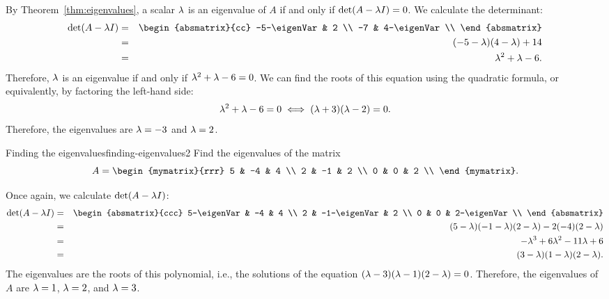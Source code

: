 \begin{solution}
  By Theorem~\ref{thm:eigenvalues}, a scalar $\lambda$ is an
  eigenvalue of $A$ if and only if $\det(A-\lambda I)=0$. We calculate
  the determinant:
  \begin{eqnarray*}
    \det(A-\eigenVar I)
    &=&
    \begin{absmatrix}{cc}
      -5-\eigenVar & 2 \\
      -7 & 4-\eigenVar \\
    \end{absmatrix} \\
    &=& (-5-\eigenVar)(4-\eigenVar) + 14 \\
    &=& \eigenVar^2 + \eigenVar - 6.
  \end{eqnarray*}
  Therefore, $\lambda$ is an eigenvalue if and only if
  $\lambda^2 + \lambda - 6 = 0$. We can find the roots of this
  equation using the quadratic formula, or equivalently, by factoring
  the left-hand side:
  \begin{equation*}
    \lambda^2 + \lambda - 6 = 0
    \iff
    (\lambda+3)(\lambda-2) = 0.
  \end{equation*}
  Therefore, the eigenvalues are $\lambda=-3$ and $\lambda=2$.
\end{solution}

\begin{example}{Finding the eigenvalues}{finding-eigenvalues2}
  Find the eigenvalues of the matrix
  \begin{equation*}
    A=\begin{mymatrix}{rrr}
      5 & -4 & 4 \\
      2 & -1 & 2 \\
      0 &  0 & 2 \\
    \end{mymatrix}.
  \end{equation*}
\end{example}

\begin{solution}
  Once again, we calculate $\det(A-\lambda I)$:
  \begin{eqnarray*}
    \det(A-\eigenVar I)
    &=&
        \begin{absmatrix}{ccc}
          5-\eigenVar & -4 & 4 \\
          2 & -1-\eigenVar & 2 \\
          0 &  0 & 2-\eigenVar \\
        \end{absmatrix} \\
    &=&
        (5-\eigenVar)(-1-\eigenVar)(2-\eigenVar) - 2(-4)(2-\eigenVar) \\
    &=& -\eigenVar^3 + 6\eigenVar^2 - 11\eigenVar + 6 \\
    &=& (3-\eigenVar)(1-\eigenVar)(2-\eigenVar).
  \end{eqnarray*}
  The eigenvalues are the roots of this polynomial, i.e., the
  solutions of the equation
  $(\lambda-3)(\lambda-1)(2-\lambda)=0$. Therefore, the eigenvalues of
  $A$ are $\lambda=1$, $\lambda=2$, and $\lambda=3$.
\end{solution}

